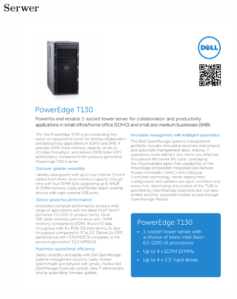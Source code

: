 \documentclass[a4paper, 12pt]{article}
\begin{document}
\subsection{Serwer}
\begin{figure}[H]
\centering
    \includegraphics[scale=0.80]{spec/serwer.pdf}%
    \label{fig:PropProf}
\end{figure}
\end{document}
